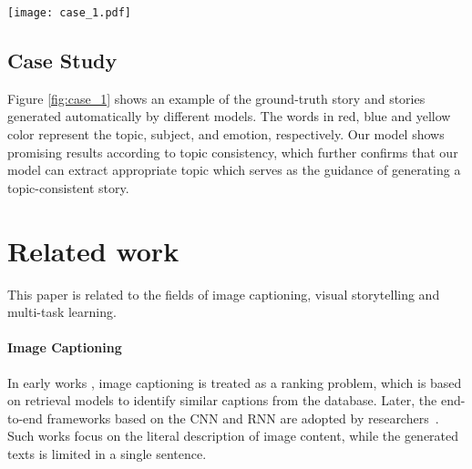 \documentclass[11pt]{article}
\newcommand{\citep}{\cite}
\begin{document}
\begin{figure*}[t!]
\begin{center}
\texttt{[image: case\_1.pdf]}  
\end{center}
\vspace*{-3ex}
   \caption{Story samples generated by different models and the ground truth. The words in red, blue and yellow color represent the topic, subject, and emotion, respectively. (Best viewed in color)}
   \label{fig:case_1}
\vspace*{-2ex}
\end{figure*}


\subsection{Case Study}
Figure \ref{fig:case_1} shows an example of the ground-truth story and stories generated automatically by different models. The words in red, blue and yellow color represent the topic, subject, and emotion, respectively. Our model shows promising results according to topic consistency, which further confirms that our model can extract appropriate topic which serves as the guidance of generating a topic-consistent story.


\section{Related work}

This paper is related to the fields of image captioning, visual storytelling and multi-task learning. 

\paragraph{Image Captioning} 
In early works \citep{Yang2011CorpusGuidedSG,Elliott2013ImageDU}, image captioning is treated as a ranking problem, which is based on retrieval models to identify similar captions from the database. Later, the end-to-end frameworks based on the CNN and RNN are adopted by researchers~\citep{xu2015show,karpathy2015deep,vinyals2017show,dai2017towards}.
Such works focus on the literal description of image content, while the generated texts is limited in a single sentence. 
\end{document}
